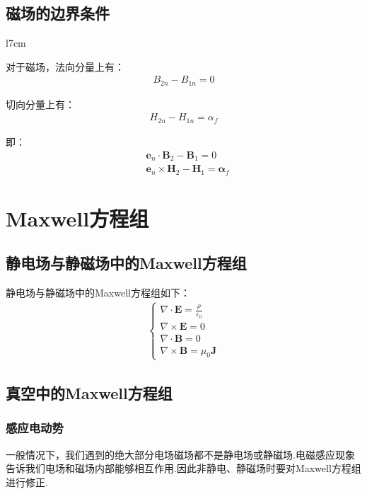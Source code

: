 \documentclass[main.tex]{subfiles}
\begin{document}
\subsection{磁场的边界条件}
\begin{wrapfigure}{l}{7cm}
	\centering
	
\end{wrapfigure}

对于磁场，法向分量上有：
\begin{align}
    B_{2n} - B_{1n} = 0
\end{align}

切向分量上有：
\begin{align}
    H_{2n} - H_{1n} = \alpha _f
\end{align}

即：
\begin{align}
    &\boldsymbol{e}_n \cdot \boldsymbol{B}_2 - \boldsymbol{B}_1 = 0\\
    &\boldsymbol{e}_n \times \boldsymbol{H}_2 - \boldsymbol{H}_1 = \boldsymbol{\alpha}_f
\end{align}

\section{Maxwell方程组}
\subsection{静电场与静磁场中的Maxwell方程组}
静电场与静磁场中的Maxwell方程组如下：
\begin{align}
\left\{\begin{array}{l}
 \nabla \cdot \boldsymbol{E} = \frac{\rho}{\varepsilon _0}\\
 \nabla \times \boldsymbol{E} = 0\\
\nabla \cdot  \boldsymbol{B} = 0\\
\nabla \times \boldsymbol{B} = \mu _0 \boldsymbol{J}
\end{array}\right.
\end{align}

\subsection{真空中的Maxwell方程组}
\subsubsection{感应电动势}
一般情况下，我们遇到的绝大部分电场磁场都不是静电场或静磁场.电磁感应现象告诉我们电场和磁场内部能够相互作用.因此非静电、静磁场时要对Maxwell方程组进行修正.
\end{document}
